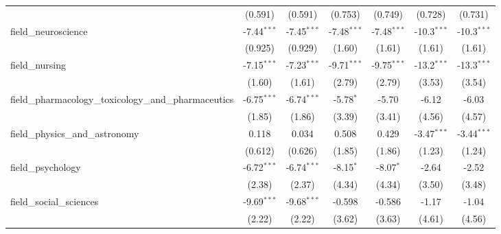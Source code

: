 \begin{tabular}{lcccccc}
                                                               & (0.591)        & (0.591)        & (0.753)       & (0.749)       & (0.728)       & (0.731)\\   
   field\_neuroscience                                         & -7.44$^{***}$  & -7.45$^{***}$  & -7.48$^{***}$ & -7.48$^{***}$ & -10.3$^{***}$ & -10.3$^{***}$\\   
                                                               & (0.925)        & (0.929)        & (1.60)        & (1.61)        & (1.61)        & (1.61)\\   
   field\_nursing                                              & -7.15$^{***}$  & -7.23$^{***}$  & -9.71$^{***}$ & -9.75$^{***}$ & -13.2$^{***}$ & -13.3$^{***}$\\   
                                                               & (1.60)         & (1.61)         & (2.79)        & (2.79)        & (3.53)        & (3.54)\\   
   field\_pharmacology\_toxicology\_and\_pharmaceutics         & -6.75$^{***}$  & -6.74$^{***}$  & -5.78$^{*}$   & -5.70         & -6.12         & -6.03\\   
                                                               & (1.85)         & (1.86)         & (3.39)        & (3.41)        & (4.56)        & (4.57)\\   
   field\_physics\_and\_astronomy                              & 0.118          & 0.034          & 0.508         & 0.429         & -3.47$^{***}$ & -3.44$^{***}$\\   
                                                               & (0.612)        & (0.626)        & (1.85)        & (1.86)        & (1.23)        & (1.24)\\   
   field\_psychology                                           & -6.72$^{***}$  & -6.74$^{***}$  & -8.15$^{*}$   & -8.07$^{*}$   & -2.64         & -2.52\\   
                                                               & (2.38)         & (2.37)         & (4.34)        & (4.34)        & (3.50)        & (3.48)\\   
   field\_social\_sciences                                     & -9.69$^{***}$  & -9.68$^{***}$  & -0.598        & -0.586        & -1.17         & -1.04\\   
                                                               & (2.22)         & (2.22)         & (3.62)        & (3.63)        & (4.61)        & (4.56)\\   

\end{tabular}
